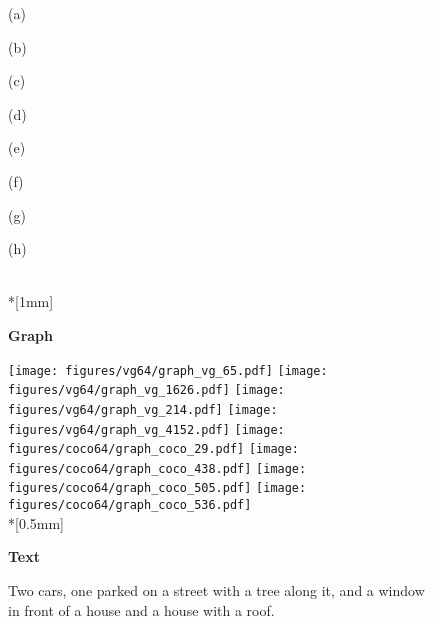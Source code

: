 \documentclass[10pt,twocolumn,letterpaper]{article}
\begin{document}
\begin{figure*}[ht!]
  \begin{minipage}{\qualsize} \centering\scriptsize (a) \end{minipage}
  \begin{minipage}{\qualsize} \centering\scriptsize (b) \end{minipage}
  \begin{minipage}{\qualsize} \centering\scriptsize (c) \end{minipage}
  \begin{minipage}{\qualsize} \centering\scriptsize (d) \end{minipage}
  \begin{minipage}{\qualsize} \centering\scriptsize (e) \end{minipage}
  \begin{minipage}{\qualsize} \centering\scriptsize (f) \end{minipage}
  \begin{minipage}{\qualsize} \centering\scriptsize (g) \end{minipage}
  \begin{minipage}{\qualsize} \centering\scriptsize (h) \end{minipage} \\*[1mm]
\begin{rotate}{90}
    \hspace{1mm}
    \textbf{Graph}
  \end{rotate}
  \hspace*{0.5mm}
  \texttt{[image: figures/vg64/graph\_vg\_65.pdf]}
  \texttt{[image: figures/vg64/graph\_vg\_1626.pdf]}
  \texttt{[image: figures/vg64/graph\_vg\_214.pdf]}
  \texttt{[image: figures/vg64/graph\_vg\_4152.pdf]}
  \texttt{[image: figures/coco64/graph\_coco\_29.pdf]}
  \texttt{[image: figures/coco64/graph\_coco\_438.pdf]}
  \texttt{[image: figures/coco64/graph\_coco\_505.pdf]}
  \texttt{[image: figures/coco64/graph\_coco\_536.pdf]} \\*[0.5mm]
  \begin{rotate}{90}
    \hspace{-2mm}\textbf{Text}
  \end{rotate}
  \hspace{\qualtextspace}
  \begin{minipage}{\qualtext}
    \ssmall
    Two cars, one parked on a street with a tree along it, and
    a window in front of a house and a house with a roof.
  \end{minipage}

\end{figure*}
\end{document}
